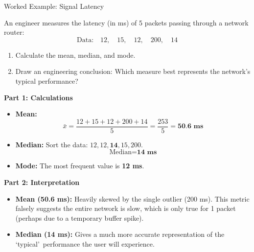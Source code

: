 \begin{frame}[allowframebreaks]{Worked Example: Signal Latency}
    \begin{example}
        An engineer measures the latency (in ms) of 5 packets passing through a network router:
        \[ \text{Data:} \quad 12, \quad 15, \quad 12, \quad 200, \quad 14 \]
        
        \begin{enumerate}
            \item Calculate the mean, median, and mode.
            \item Draw an engineering conclusion: Which measure best represents the network's typical performance?
        \end{enumerate}
    \end{example}
    
    \pause
    
    \begin{solution}
        \textbf{Part 1: Calculations}
        \begin{itemize}
            \item \textbf{Mean:} 
            \[ \bar{x} = \frac{12+15+12+200+14}{5} = \frac{253}{5} = \textbf{50.6 ms} \]
            \item \textbf{Median:} Sort the data: $12, 12, \mathbf{14}, 15, 200$. 
            \[ \text{Median} = \textbf{14 ms} \]
            \item \textbf{Mode:} The most frequent value is \textbf{12 ms}.
        \end{itemize}
        \end{solution}
        \vspace{0.3cm}
        \begin{solution}
        \textbf{Part 2: Interpretation}
        \begin{itemize}
            \item \textbf{Mean (50.6 ms):} Heavily skewed by the single outlier (200 ms). This metric falsely suggests the entire network is slow, which is only true for 1 packet (perhaps due to a temporary buffer spike).
            \item \textbf{Median (14 ms):} Gives a much more accurate representation of the \lq typical\rq\ performance the user will experience.
        \end{itemize}
    \end{solution}
    

\end{frame}
